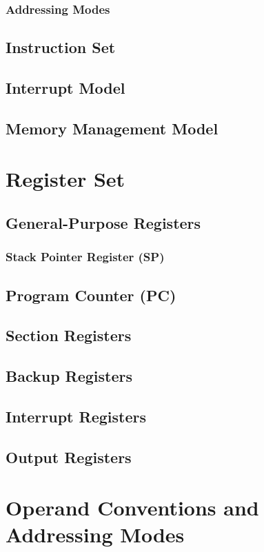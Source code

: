 \documentclass[twoside,a4paper]{memoir}
\begin{document}
\subsection{Addressing Modes}
\section{Instruction Set}
\section{Interrupt Model}
\section{Memory Management Model}

\chapter{Register Set}
\section{General-Purpose Registers}
\subsection{Stack Pointer Register (SP)}
\section{Program Counter (PC)}
\section{Section Registers}
\section{Backup Registers}
\section{Interrupt Registers}
\section{Output Registers}

\chapter{Operand Conventions and Addressing Modes}
\end{document}
